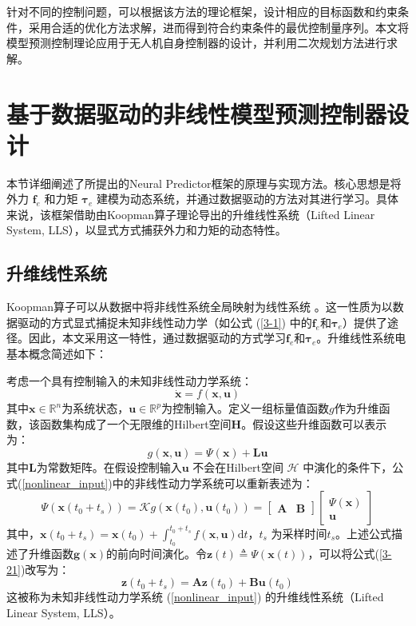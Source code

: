 \documentclass[lang=chs, degree=master, blindreview=false, winfonts=true]{yanputhesis}
\begin{document}
针对不同的控制问题，可以根据该方法的理论框架，设计相应的目标函数和约束条件，采用合适的优化方法求解，进而得到符合约束条件的最优控制量序列。本文将模型预测控制理论应用于无人机自身控制器的设计，并利用二次规划方法进行求解。

\section{基于数据驱动的非线性模型预测控制器设计}
本节详细阐述了所提出的Neural Predictor框架的原理与实现方法。核心思想是将外力 $\bm{f}_e$ 和力矩 $\bm{\tau}_e$ 建模为动态系统，并通过数据驱动的方法对其进行学习。具体来说，该框架借助由Koopman算子理论导出的升维线性系统（Lifted Linear System, LLS），以显式方式捕获外力和力矩的动态特性。

\subsection{升维线性系统}
Koopman算子可以从数据中将非线性系统全局映射为线性系统 \cite{Mamakoukas2023}。这一性质为以数据驱动的方式显式捕捉未知非线性动力学（如公式 (\ref{3-1}) 中的$\bm f_e$和$\bm \tau_e$）提供了途径。因此，本文采用这一特性，通过数据驱动的方式学习$\bm f_e$和$\bm \tau_e$。升维线性系统电基本概念简述如下：

考虑一个具有控制输入的未知非线性动力学系统： 
\begin{equation} 
	\dot{\bm{x}} = {f}(\bm{x},\bm{u}) \label{nonlinear_input} \end{equation} 
其中$\bm{x} \in \mathbb{R}^n$为系统状态，$\bm{u} \in \mathbb{R}^p$为控制输入。定义一组标量值函数${g}$作为升维函数，该函数集构成了一个无限维的Hilbert空间$\mathcal{\bm H}$。假设这些升维函数可以表示为： 
\begin{equation} 
	{g}(\bm{x},\bm{u}) = {\Psi}(\bm{x}) + \bm{L}\bm{u} 
\end{equation} 
其中$\bm{L}$为常数矩阵。在假设控制输入$\bm{u}$ 不会在Hilbert空间 $\mathcal{H}$ 中演化的条件下，公式(\ref{nonlinear_input})中的非线性动力学系统可以重新表述为： 
\begin{equation} 
	{\Psi}(\bm{x}(t_0+t_s)) = {\mathcal{K}} {g}(\bm{x}(t_0), \bm{u}(t_0)) = \begin{bmatrix}\bm A&\bm B\end{bmatrix}\begin{bmatrix}\Psi(\bm x)\\\bm u\end{bmatrix}
\label{3-21} 
\end{equation} 
其中，$\bm{x}(t_0+t_s)=\bm{x}(t_0)+\int_{t_0}^{t_0+t_s}{f}(\bm{x},\bm{u}){\mathrm{d}t}$，$t_s$ 为采样时间$t_s$。上述公式描述了升维函数$\bm{g}(\bm{x})$的前向时间演化。令$\bm{z}(t) \triangleq {\Psi}(\bm{x}(t))$，可以将公式(\ref{3-21})改写为： 
\begin{equation} \bm{z}(t_0 + t_s) = \bm{A}\bm{z}(t_0) + \bm{B}\bm{u}(t_0) \label{lls} 
\end{equation} 
这被称为未知非线性动力学系统 (\ref{nonlinear_input}) 的升维线性系统（Lifted Linear System, LLS）。
\end{document}

